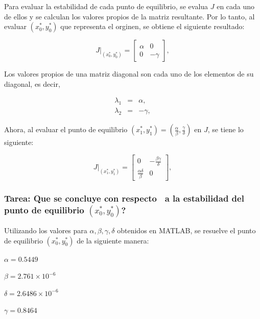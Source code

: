 \documentclass[letterpaper,11pt]{article}
\begin{document}
Para evaluar la estabilidad de cada punto de equilibrio, se evalua $J$ en
cada uno de ellos y se calculan los valores propios de la matriz resultante.
Por lo tanto, al evaluar $(x_{0}^{\ast },y_{0}^{\ast })$ que representa el
orginen, se obtiene el siguiente resultado:

\begin{equation*}
\left. J\right\vert _{(x_{0}^{\ast },y_{0}^{\ast })}=\left[ 
\begin{array}{cc}
\alpha & 0 \\ 
0 & -\gamma%
\end{array}%
\right] ,
\end{equation*}

Los valores propios de una matriz diagonal son cada uno de los elementos de
su diagonal, es decir,

\begin{eqnarray*}
\lambda _{1} &=&\alpha , \\
\lambda _{2} &=&-\gamma ,
\end{eqnarray*}

\bigskip

Ahora, al evaluar el punto de equilibrio $(x_{1}^{\ast },y_{1}^{\ast })=(%
\frac{\alpha }{\beta },\frac{\gamma }{\delta })$ en $J$, se tiene lo
siguiente:

\begin{equation*}
\left. J\right\vert _{(x_{1}^{\ast },y_{1}^{\ast })}=\left[ 
\begin{array}{cc}
0 & -\frac{\beta \gamma }{\delta } \\ 
\frac{\alpha \delta }{\beta } & 0%
\end{array}%
\right] ,
\end{equation*}

\subsubsection{\textbf{Tarea:} Que se concluye con respecto \ a la
estabilidad del punto de equilibrio $(x_{0}^{\ast },y_{0}^{\ast })$?}

\bigskip Utilizando los valores para $\alpha ,\beta ,\gamma ,\delta $
obtenidos en MATLAB, se resuelve el punto de equilibrio $(x_{0}^{\ast
},y_{0}^{\ast })$ de la siguiente manera:

$\alpha =0.5449$

$\beta =2.761\times 10^{-6}$

$\delta =2.6486\times 10^{-6}$

$\gamma =0.8464$
\end{document}
